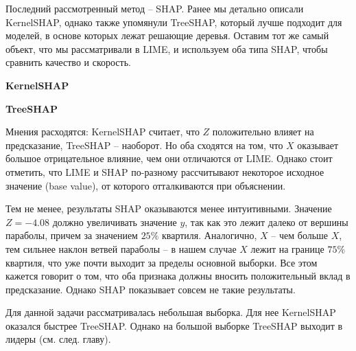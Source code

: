 Последний рассмотренный метод -- SHAP. Ранее мы детально описали KernelSHAP, однако также упомянули TreeSHAP, который лучше подходит для моделей, в основе которых лежат решающие деревья. Оставим тот же самый объект, что мы рассматривали в LIME, и используем оба типа SHAP, чтобы сравнить качество и скорость.

\textbf{KernelSHAP}

\vspace{-1mm}
\begin{figure}[h]
\end{figure}
\vspace{-5mm}

\textbf{TreeSHAP}

\vspace{-1mm}
\begin{figure}[h]
\end{figure}
\vspace{-5mm}

Мнения расходятся: KernelSHAP считает, что $Z$ положительно влияет на предсказание, TreeSHAP -- наоборот. Но оба сходятся на том, что $X$ оказывает большое отрицательное влияние, чем они отличаются от LIME. Однако стоит отметить, что LIME и SHAP по-разному рассчитывают некоторое исходное значение (base value), от которого отталкиваются при объяснении.

Тем не менее, результаты SHAP оказываются менее интуитивными. Значение $Z = -4.08$ должно увеличивать значение $y$, так как это лежит далеко от вершины параболы, причем за значением $25\%$ квартиля. Аналогично, $X$ -- чем больше $X$, тем сильнее наклон ветвей параболы --  в нашем случае $X$ лежит на границе $75\%$ квартиля, что уже почти выходит за пределы основной выборки. Все этом кажется говорит о том, что оба признака должны вносить положительный вклад в предсказание. Однако SHAP показывает совсем не такие результаты.

Для данной задачи рассматривалась небольшая выборка. Для нее KernelSHAP оказался быстрее TreeSHAP. Однако на большой выборке TreeSHAP выходит в лидеры (см. след. главу).

